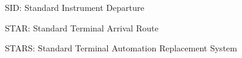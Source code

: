       SID: Standard Instrument Departure


      STAR: Standard Terminal Arrival Route

     STARS: Standard Terminal Automation Replacement System



